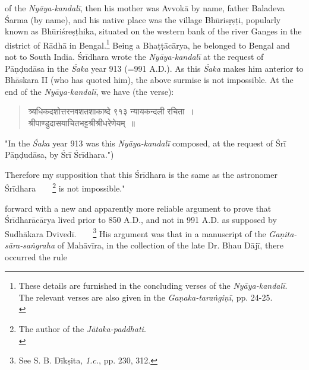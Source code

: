 \documentclass[10pt, openany]{book}
\begin{document}
\justify{}
{of the \textit{Nyāya-kandalī}, then his mother was Avvokā by name,}
{father Baladeva Śarma (by name), and his native place was}
{the village Bhūrisṛṣṭi, popularly known as Bhūriśreṣṭhika,}
{situated on the western bank of the river Ganges in the}
{district of Rādhā in Bengal.\renewcommand{\thefootnote}{1}\footnote{\hspace{-2mm} \englishfont These details are furnished in the concluding verses of the
\textit{Nyāya-kandalī}. The relevant verses are also given in the
\textit{Gaṇaka-taraṅgiṇī}, pp. 24-25.\\} Being a Bhaṭṭācārya, he belonged}
{to Bengal and not to South India. Śrīdhara wrote the \textit{Nyāya-kandalī} at the request of Pāṇḍudāsa in the \textit{Śaka }year 913}
{(=991 A.D.). As this \textit{Śaka} makes him anterior to Bhāskara II}
{(who has quoted him), the above surmise is not impossible.}
{At the end of the \textit{Nyāya-kandalī}, we have (the verse):}

\begin{quote}
{\qt त्र्यधिकदशोत्तरनवशतशाकाब्दे ९१३ न्यायकन्दली रचिता~। \\
 श्रीपाण्डुदासयाचितभट्टश्रीश्रीधरेणेयम्~॥ }
\end{quote}
\vspace{-2mm}

\noindent{} {\eqt "In the \textit{Śaka} year 913 was this \textit{Nyāya-kandalī} composed, at the request of Śrī Pāṇḍudāsa, by Śrī Śrīdhara.")}

\vspace{0.3cm}
{Therefore my supposition that this Śrīdhara is the same as the}
{astronomer Śrīdhara~~~~\renewcommand{\thefootnote}{\hspace{-4.5mm} 2}\footnote{\hspace{-2mm} \englishfont The author of the \textit{Jātaka-paddhati}.\\} is not impossible."}

\vspace{0.3cm}{A few years later Śaṅkara Bālakṛṣṇa Dīkṣita came}
{forward with a new and apparently more reliable argument}
{to prove that Śrīdharācārya lived prior to 850 A.D., and not}
{in 991 A.D. as supposed by Sudhākara Dvivedī.~~~~\renewcommand{\thefootnote}{\hspace{-4.5mm} 3}\footnote{\hspace{-2mm} \englishfont See S. B. Dīkṣita, \textit{1.c.}, pp. 230, 312.}  His}
{argument was that in a manuscript of the
\textit{Gaṇita-sāra-saṅgraha}}
{of Mahāvīra, in the collection of the late Dr. Bhau Dājī, there}
{occurred the rule}
\end{document}
